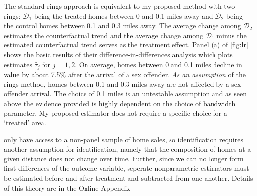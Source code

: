 \documentclass[10pt]{article}
\begin{document}
The standard rings approach is equivalent to my proposed method with two rings: $\mathcal{D}_1$ being the treated homes between 0 and 0.1 miles away and $\mathcal{D}_2$ being the control homes between 0.1 and 0.3 miles away. The average change among $\mathcal{D}_2$ estimates the counterfactual trend and the average change among $\mathcal{D}_1$ minus the estimated counterfactual trend serves as the treatment effect. Panel (a) of \autoref{fig:lr} shows the basic results of their difference-in-differences analysis which plots estimates $\hat{\tau}_j$ for $j = 1,2$.  On average, homes between 0 and 0.1 miles decline in value by about 7.5\% after the arrival of a sex offender. \emph{As an assumption} of the rings method, homes between 0.1 and 0.3 miles away are not affected by a sex offender arrival. The choice of 0.1 miles is an untestable assumption and as seen above the evidence provided is highly dependent on the choice of bandwidth parameter. My proposed estimator does not require a specific choice for a `treated' area.

\citet{Linden_Rockoff_2008} only have access to a non-panel sample of home sales, so identification requires another assumption for identification, namely that the composition of homes at a given distance does not change over time. Further, since we can no longer form first-differences of the outcome variable, seperate nonparametric estimators must be estimated before and after treatment and subtracted from one another. Details of this theory are in the Online Appendix
\end{document}
